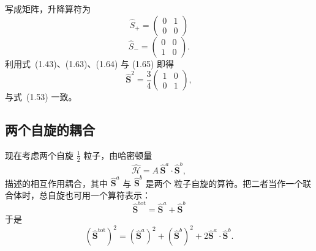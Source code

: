 写成矩阵，升降算符为
\begin{equation*}
\hat{S}_{+} = \begin{pmatrix}0 & 1\\ 0 & 0\end{pmatrix}\tag{1.64}
\end{equation*}
\begin{equation*}
\hat{S}_{-} = \begin{pmatrix}0 & 0\\ 1 & 0\end{pmatrix}.\tag{1.65}
\end{equation*}
利用式~(1.43)、(1.63)、(1.64) 与 (1.65) 即得
\begin{equation*}
\hat{\mathbf{S}}^{2} = \frac{3}{4}\begin{pmatrix}1 & 0\\ 0 & 1\end{pmatrix},\tag{1.66}
\end{equation*}
与式~(1.53) 一致。

\subsection{两个自旋的耦合}

现在考虑两个自旋 $\frac{1}{2}$ 粒子，由哈密顿量
\begin{equation*}
\hat{\mathcal{H}} = A\,\hat{\mathbf{S}}^{a}\cdot\hat{\mathbf{S}}^{b},\tag{1.67}
\end{equation*}
描述的相互作用耦合，其中 $\hat{\mathbf{S}}^{a}$ 与 $\hat{\mathbf{S}}^{b}$ 是两个
粒子自旋的算符。把二者当作一个联合体时，总自旋也可用一个算符表示：
\begin{equation*}
\hat{\mathbf{S}}^{\mathrm{tot}} = \hat{\mathbf{S}}^{a}+\hat{\mathbf{S}}^{b}\tag{1.68}
\end{equation*}
于是
\begin{equation*}
(\hat{\mathbf{S}}^{\mathrm{tot}})^{2} = (\hat{\mathbf{S}}^{a})^{2}+(\hat{\mathbf{S}}^{b})^{2}+2\hat{\mathbf{S}}^{a}\cdot\hat{\mathbf{S}}^{b}.\tag{1.69}
\end{equation*}


